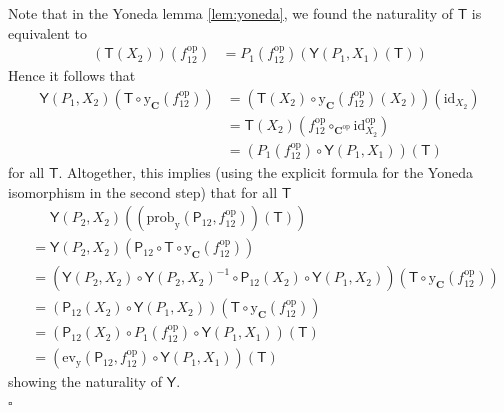 \begin{prf}
Note that in the Yoneda lemma \ref{lem:yoneda}, we found the naturality of $\mathsf{T}$ is equivalent to
\begin{align*}
  (\mathsf{T}(X_{2}))(f_{12}^{\mathrm{op}})
  &=
  P_{1}(f_{12}^{\mathrm{op}})
  \left(
    \mathsf{Y}(P_{1},X_{1})
    (\mathsf{T})
  \right)
\end{align*}
Hence it follows that
\begin{align*}
  \mathsf{Y}(P_{1},X_{2})
  \left(
    \mathsf{T}
    \circ
    \mathrm{y}_{\mathbf{C}}(f_{12}^{\mathrm{op}})
  \right)
  &=
  \left(
    \mathsf{T}(X_{2})
    \circ
    \mathrm{y}_{\mathbf{C}}(f_{12}^{\mathrm{op}})(X_{2})
  \right)
  (\mathrm{id}_{X_{2}})
  \\
  &=
  \mathsf{T}(X_{2})
  \left(
    f_{12}^{\mathrm{op}}
    \circ_{\mathbf{C}^{\mathrm{op}}}
    \mathrm{id}_{X_{2}}^{\mathrm{op}}
  \right)
  \\
  &{=}
  \left(
    P_{1}(f_{12}^{\mathrm{op}})
    \circ
    \mathsf{Y}(P_{1},X_{1})
  \right)
  (\mathsf{T})
  \tag{NT}
\end{align*}
for all $\mathsf{T}$.
Altogether, this implies (using the explicit formula for the Yoneda isomorphism in the second step) that for all $\mathsf{T}$
\begin{align*}
  &\phantom{=}
  \mathsf{Y}(P_{2},X_{2})
  \left(
    \left(
      \mathrm{prob}_{\mathrm{y}}
      (\mathsf{P}_{12},f_{12}^{\mathrm{op}})
    \right)
    (\mathsf{T})
  \right)
  \\
  &=
  \mathsf{Y}(P_{2},X_{2})
  \left(
    \mathsf{P}_{12}
    \circ
    \mathsf{T}
    \circ
    \mathrm{y}_{\mathbf{C}}(f_{12}^{\mathrm{op}})
  \right)
  \\
  &=
  \left(
    \mathsf{Y}(P_{2},X_{2})
    \circ
    \mathsf{Y}(P_{2},X_{2})^{-1}
    \circ
    \mathsf{P}_{12}(X_{2})
    \circ
    \mathsf{Y}(P_{1},X_{2})
  \right)
  \left(
    \mathsf{T}
    \circ
    \mathrm{y}_{\mathbf{C}}(f_{12}^{\mathrm{op}})
  \right)
  \\
  &=
  \left(
    \mathsf{P}_{12}(X_{2})
    \circ
    \mathsf{Y}(P_{1},X_{2})
  \right)
  \left(
    \mathsf{T}
    \circ
    \mathrm{y}_{\mathbf{C}}(f_{12}^{\mathrm{op}})
  \right)
  \\
  &=
  \left(
    \mathsf{P}_{12}(X_{2})
    \circ
    P_{1}(f_{12}^{\mathrm{op}})
    \circ
    \mathsf{Y}(P_{1},X_{1})
  \right)
  (\mathsf{T})
  \\
  &=
  \left(
    \mathrm{ev}_{\mathrm{y}}
    (\mathsf{P}_{12},f_{12}^{\mathrm{op}})
    \circ
    \mathsf{Y}(P_{1},X_{1})
  \right)
  (\mathsf{T})
\end{align*}
showing the naturality of $\mathsf{Y}$.
\\
\phantom{proven}
\hfill
$\square$
\end{prf}
